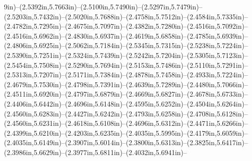 9in)--(2.5392in,5.7663in)--(2.5100in,5.7490in)--(2.5297in,5.7479in)--(2.5203in,5.7432in)--(2.5020in,5.7688in)--(2.4758in,5.7512in)--(2.4584in,5.7335in)--(2.4782in,5.7295in)--(2.4675in,5.7097in)--(2.4382in,5.7280in)--(2.4516in,5.7092in)--(2.4516in,5.6962in)--(2.4830in,5.6937in)--(2.4619in,5.6858in)--(2.4785in,5.6939in)--(2.4806in,5.6925in)--(2.5062in,5.7184in)--(2.5345in,5.7315in)--(2.5238in,5.7224in)--(2.5390in,5.7251in)--(2.5324in,5.7439in)--(2.5242in,5.7204in)--(2.5305in,5.7123in)--(2.5454in,5.7508in)--(2.5290in,5.7694in)--(2.5153in,5.7486in)--(2.5110in,5.7291in)--(2.5313in,5.7207in)--(2.5171in,5.7384in)--(2.4878in,5.7458in)--(2.4933in,5.7224in)--(2.4679in,5.7530in)--(2.4798in,5.7391in)--(2.4639in,5.7289in)--(2.4480in,5.7066in)--(2.4511in,5.6920in)--(2.4797in,5.6879in)--(2.4669in,5.6827in)--(2.4678in,5.6733in)--(2.4406in,5.6442in)--(2.4696in,5.6148in)--(2.4595in,5.6252in)--(2.4504in,5.6264in)--(2.4560in,5.6283in)--(2.4427in,5.6242in)--(2.4793in,5.6258in)--(2.4708in,5.6128in)--(2.4560in,5.6231in)--(2.4618in,5.6108in)--(2.4696in,5.6312in)--(2.4471in,5.6266in)--(2.4399in,5.6210in)--(2.4203in,5.6235in)--(2.4035in,5.5995in)--(2.4179in,5.6059in)--(2.4035in,5.6149in)--(2.3907in,5.6014in)--(2.3800in,5.6313in)--(2.3825in,5.6417in)--(2.3986in,5.6629in)--(2.3977in,5.6811in)--(2.4032in,5.6941in)--
